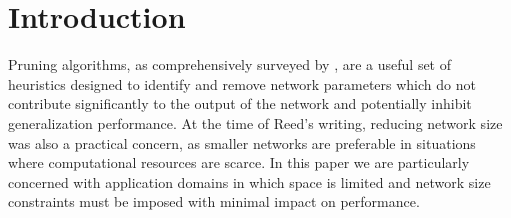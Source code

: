 \section{Introduction}\label{sec1}

Pruning algorithms, as comprehensively surveyed by \cite{reed1993pruning}, are a useful set of heuristics designed to identify and remove network parameters which do not contribute significantly to the output of the network and potentially inhibit generalization performance. At the time of Reed's writing, reducing network size was also a practical concern, as smaller networks are preferable in situations where computational resources are scarce. In this paper we are particularly concerned with application domains in which space is limited and network size constraints must be imposed with minimal impact on performance.